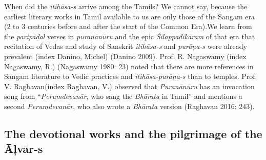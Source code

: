 \item When did the \textit{itihāsa-s} arrive among the Tamils? We cannot say, because the earliest literary works in Tamil available to us are only those of the Sangam era (2 to 3 centuries before and after the start of the Common Era).We learn from the \textit{paripāḍal} verses in \textit{puranānūru} and the epic \textit{Śilappadikāram} of that era that recitation of Vedas and study of Sanskrit \textit{itihāsa-s} and \textit{purāņa-s} were already prevalent (index Danino, Michel) (Danino 2009). Prof. R. Nagaswamy (index Nagaswamy, R.) (Nagaswamy 1980: 23) noted that there are more references in Sangam literature to Vedic practices and \textit{itihāsa-purāṇa-s} than to temples. Prof. V. Raghavan(index Raghavan, V.) observed that \textit{Puranānūru} has an invocation song from “\textit{Perumdevanār}, who sang the \textit{Bhārata} in Tamil” and mentions a second \textit{Perumdevanār}, who also wrote a \textit{Bhārata} version (Raghavan 2016: 243).



\subsection{The devotional works and the pilgrimage of the Āļvār-s}


